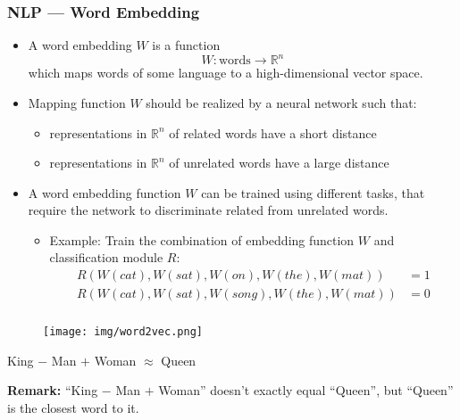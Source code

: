 \documentclass[UTF8,11pt,colorlinks,compress,openany]{beamer}%
\begin{document}
\begin{frame}\frametitle{NLP --- Word Embedding}
\begin{itemize}
\item A word embedding $W$ is a function
\[W:\mbox{words}\to\mathbb{R}^n\]
which maps words of some language to a high-dimensional vector space.
\item Mapping function $W$ should be realized by a neural network such that:
\begin{itemize}
	\item representations in $\mathbb{R}^n$ of related words have a short distance
	\item representations in $\mathbb{R}^n$ of unrelated words have a large distance
\end{itemize}
\item A word embedding function $W$ can be trained using different tasks, that require the network to discriminate related from unrelated words.
\begin{itemize}
	\item Example: Train the combination of embedding function $W$ and classification module $R$:
\begin{align*}
	R(W(cat),W(sat),W(on),W(the),W(mat))&=1\\
	R(W(cat),W(sat),W(song),W(the),W(mat))&=0
\end{align*}
\end{itemize}
\end{itemize}
\end{frame}

\begin{frame}\frametitle{}
\begin{figure}[H]
	\texttt{[image: img/word2vec.png]}
\end{figure}
\centerline{King $-$ Man $+$ Woman $\approx$ Queen}
\textbf{Remark:} ``King $-$ Man $+$ Woman'' doesn't exactly equal ``Queen'', but ``Queen'' is the closest word to it.
\end{frame}
\end{document}
